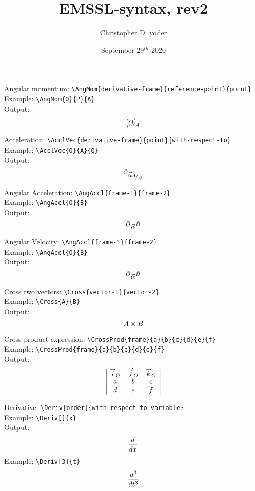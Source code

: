 \documentclass{article}
\title{EMSSL-syntax, rev2}
\author{Christopher D. yoder}
\date{September 29$^{th}$ 2020}
\begin{document}
\maketitle

\noindent
Angular momentum: \verb|\AngMom{derivative-frame}{reference-point}{point}|\\
Example: \verb|\AngMom{O}{P}{A}|\\
Output:
\begin{equation*}
    \AngMom{O}{P}{A}
\end{equation*}

\noindent
Acceleration: \verb|\AcclVec{derivative-frame}{point}{with-respect-to}|\\
Example: \verb|\AcclVec{O}{A}{Q}|\\
Output:
\begin{equation*}
    \AcclVec{O}{A}{Q}
\end{equation*}

\noindent
Angular Acceleration: \verb|\AngAccl{frame-1}{frame-2}|\\
Example: \verb|\AngAccl{O}{B}|\\
Output:
\begin{equation*}
    \AngAccl{O}{B}
\end{equation*}

\noindent
Angular Velocity: \verb|\AngAccl{frame-1}{frame-2}|\\
Example: \verb|\AngAccl{O}{B}|\\
Output:
\begin{equation*}
    \AngAccl{O}{B}
\end{equation*}

\noindent
Cross two vectors: \verb|\Cross{vector-1}{vector-2}|\\
Example: \verb|\Cross{A}{B}|\\
Output:
\begin{equation*}
    \Cross{A}{B}
\end{equation*}

\noindent
Cross product expression: \verb|\CrossProd{frame}{a}{b}{c}{d}{e}{f}|\\
Example: \verb|\CrossProd{frame}{a}{b}{c}{d}{e}{f}|\\
Output:
\begin{equation*}
    \CrossProd{O}{a}{b}{c}{d}{e}{f}
\end{equation*}

\noindent
Derivative: \verb|\Deriv[order]{with-respect-to-variable}|\\
Example: \verb|\Deriv[]{x}|\\
Output:
\begin{equation*}
    \Deriv[]{x}
\end{equation*}
Example: \verb|\Deriv[3]{t}|\\
\begin{equation*}
    \Deriv[3]{t}
\end{equation*}
\end{document}
